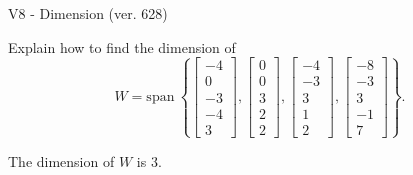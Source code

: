 \begin{exercise}
  \begin{exerciseTitle}V8 - Dimension (ver. 628)\end{exerciseTitle}
  \begin{exerciseStatement}
    Explain how to find the dimension of 
\[W=\mathrm{span}\ \left\{\left[\begin{array}{r}
-4 \\
0 \\
-3 \\
-4 \\
3
\end{array}\right] , \left[\begin{array}{r}
0 \\
0 \\
3 \\
2 \\
2
\end{array}\right] , \left[\begin{array}{r}
-4 \\
-3 \\
3 \\
1 \\
2
\end{array}\right] , \left[\begin{array}{r}
-8 \\
-3 \\
3 \\
-1 \\
7
\end{array}\right]\right\}.\]



  \end{exerciseStatement}
  \begin{exerciseAnswer}
   The dimension of \(W\) is  \(3\).
  


  \end{exerciseAnswer}
\end{exercise}